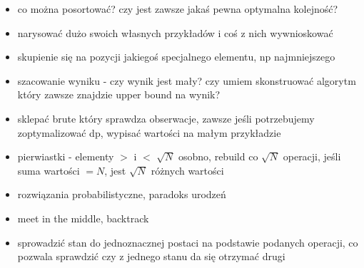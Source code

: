 \begin{itemize}[noitemsep]
	\item co można posortować? czy jest zawsze jakaś pewna optymalna kolejność?
	\item narysować dużo swoich własnych przykładów i coś z nich wywnioskować
	\item skupienie się na pozycji jakiegoś specjalnego elementu, np najmniejszego
	\item szacowanie wyniku - czy wynik jest mały? czy umiem skonstruować algorytm który zawsze znajdzie upper bound na wynik?
	\item sklepać brute który sprawdza obserwacje, zawsze jeśli potrzebujemy zoptymalizować dp, wypisać wartości na małym przykładzie
	\item pierwiastki - elementy $>$ i $<$ $\sqrt{N}$ osobno, rebuild co $\sqrt{N}$ operacji, jeśli suma wartości $=N$, jest $\sqrt{N}$ różnych wartości
	\item rozwiązania probabilistyczne, paradoks urodzeń
	\item meet in the middle, backtrack
	\item sprowadzić stan do jednoznacznej postaci na podstawie podanych operacji, co pozwala sprawdzić czy z jednego stanu da się otrzymać drugi
\end{itemize}

